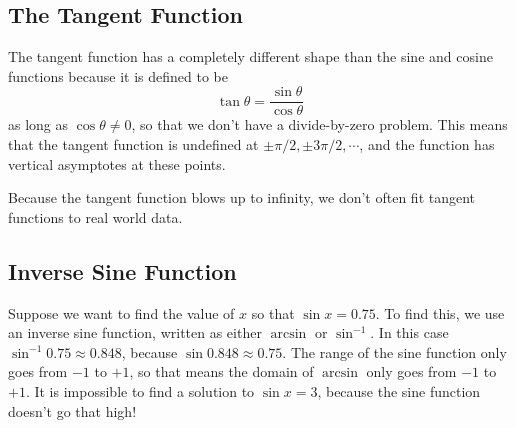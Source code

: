 






\subsection*{The Tangent Function}

The tangent function has a completely different shape than the sine and cosine functions because it is defined to be
\[ \tan \theta = \frac{\sin \theta}{\cos \theta} \]
as long as $\cos \theta \neq 0$, so that we don't have a divide-by-zero problem.  This
means that the tangent function is undefined at $\pm \pi/2, \pm 3 \pi/2, \cdots$, and the
function has vertical asymptotes at these points.
\begin{center}
\end{center}
Because the tangent function blows up to infinity, we don't often fit tangent functions to real world data.

\subsection*{Inverse Sine Function}

Suppose we want to find the value of $x$ so that $\sin x = 0.75$.  To find this, we use an
inverse sine function, written as either $\arcsin$ or $\sin^{-1}$.  In this case
$\sin^{-1} 0.75 \approx 0.848$, because $\sin 0.848 \approx 0.75$.  The range of the sine
function only goes from $-1$ to $+1$, so that means the domain of $\arcsin$ only goes from
$-1$ to $+1$.  It is impossible to find a solution to $\sin x = 3$, because the sine
function doesn't go that high!

